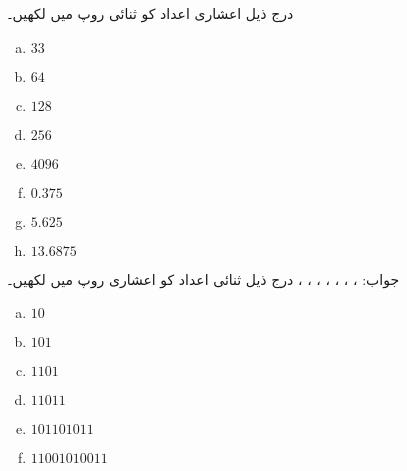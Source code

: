
درج ذیل اعشاری اعداد کو ثنائی روپ میں لکھیں۔
\begin{multicols}{4}
\begin{enumerate}[a.]

\item

 \(33\)

\item

 \(64\)

\item

 \(128\) 

\item

 \(256\)

\item

 \(4096\)

\item

 \(0.375\)

\item

 \(5.625\) 

\item

 \(13.6875\)
\end{enumerate}
\end{multicols}
جواب: ، ، ، ، ، ، ، 
درج ذیل ثنائی اعداد کو اعشاری روپ میں لکھیں۔
\begin{multicols}{4}
\begin{enumerate}[a.]

\item  
 
 \(10\)  

\item  
 
 \(101\) 

\item  
 
 \(1101\)  

\item  
 
 \(11011\)

\item  
 
 \(101101011\) 

\item  
 
 \(11001010011\)  
\end{enumerate}
\end{multicols}
